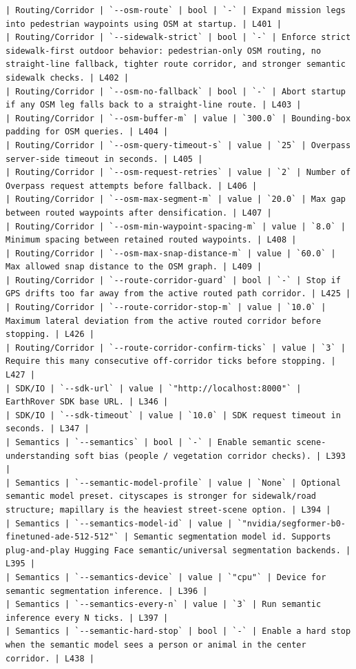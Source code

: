 \documentclass[11pt]{article}
\begin{document}
\begin{lstlisting}
| Routing/Corridor | `--osm-route` | bool | `-` | Expand mission legs into pedestrian waypoints using OSM at startup. | L401 |
| Routing/Corridor | `--sidewalk-strict` | bool | `-` | Enforce strict sidewalk-first outdoor behavior: pedestrian-only OSM routing, no straight-line fallback, tighter route corridor, and stronger semantic sidewalk checks. | L402 |
| Routing/Corridor | `--osm-no-fallback` | bool | `-` | Abort startup if any OSM leg falls back to a straight-line route. | L403 |
| Routing/Corridor | `--osm-buffer-m` | value | `300.0` | Bounding-box padding for OSM queries. | L404 |
| Routing/Corridor | `--osm-query-timeout-s` | value | `25` | Overpass server-side timeout in seconds. | L405 |
| Routing/Corridor | `--osm-request-retries` | value | `2` | Number of Overpass request attempts before fallback. | L406 |
| Routing/Corridor | `--osm-max-segment-m` | value | `20.0` | Max gap between routed waypoints after densification. | L407 |
| Routing/Corridor | `--osm-min-waypoint-spacing-m` | value | `8.0` | Minimum spacing between retained routed waypoints. | L408 |
| Routing/Corridor | `--osm-max-snap-distance-m` | value | `60.0` | Max allowed snap distance to the OSM graph. | L409 |
| Routing/Corridor | `--route-corridor-guard` | bool | `-` | Stop if GPS drifts too far away from the active routed path corridor. | L425 |
| Routing/Corridor | `--route-corridor-stop-m` | value | `10.0` | Maximum lateral deviation from the active routed corridor before stopping. | L426 |
| Routing/Corridor | `--route-corridor-confirm-ticks` | value | `3` | Require this many consecutive off-corridor ticks before stopping. | L427 |
| SDK/IO | `--sdk-url` | value | `"http://localhost:8000"` | EarthRover SDK base URL. | L346 |
| SDK/IO | `--sdk-timeout` | value | `10.0` | SDK request timeout in seconds. | L347 |
| Semantics | `--semantics` | bool | `-` | Enable semantic scene-understanding soft bias (people / vegetation corridor checks). | L393 |
| Semantics | `--semantic-model-profile` | value | `None` | Optional semantic model preset. cityscapes is stronger for sidewalk/road structure; mapillary is the heaviest street-scene option. | L394 |
| Semantics | `--semantics-model-id` | value | `"nvidia/segformer-b0-finetuned-ade-512-512"` | Semantic segmentation model id. Supports plug-and-play Hugging Face semantic/universal segmentation backends. | L395 |
| Semantics | `--semantics-device` | value | `"cpu"` | Device for semantic segmentation inference. | L396 |
| Semantics | `--semantics-every-n` | value | `3` | Run semantic inference every N ticks. | L397 |
| Semantics | `--semantic-hard-stop` | bool | `-` | Enable a hard stop when the semantic model sees a person or animal in the center corridor. | L438 |

\end{lstlisting}
\end{document}

